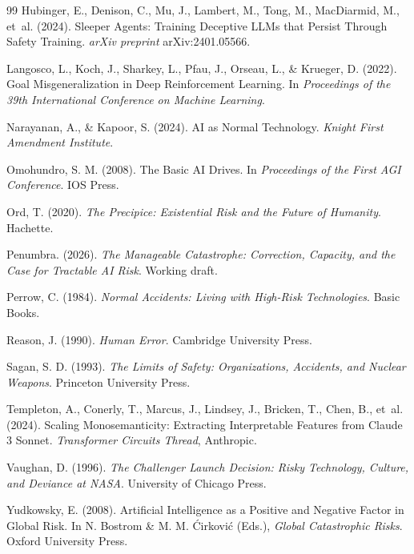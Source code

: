 \documentclass[11pt]{article}
\begin{document}
\begin{thebibliography}{99}
Hubinger, E., Denison, C., Mu, J., Lambert, M., Tong, M., MacDiarmid, M., et~al. (2024). Sleeper Agents: Training Deceptive LLMs that Persist Through Safety Training. \textit{arXiv preprint} arXiv:2401.05566.

Langosco, L., Koch, J., Sharkey, L., Pfau, J., Orseau, L., \& Krueger, D. (2022). Goal Misgeneralization in Deep Reinforcement Learning. In \textit{Proceedings of the 39th International Conference on Machine Learning}.

Narayanan, A., \& Kapoor, S. (2024). AI as Normal Technology. \textit{Knight First Amendment Institute}.

Omohundro, S. M. (2008). The Basic AI Drives. In \textit{Proceedings of the First AGI Conference}. IOS Press.

Ord, T. (2020). \textit{The Precipice: Existential Risk and the Future of Humanity}. Hachette.

Penumbra. (2026). \textit{The Manageable Catastrophe: Correction, Capacity, and the Case for Tractable AI Risk}. Working draft.

Perrow, C. (1984). \textit{Normal Accidents: Living with High-Risk Technologies}. Basic Books.

Reason, J. (1990). \textit{Human Error}. Cambridge University Press.

Sagan, S. D. (1993). \textit{The Limits of Safety: Organizations, Accidents, and Nuclear Weapons}. Princeton University Press.

Templeton, A., Conerly, T., Marcus, J., Lindsey, J., Bricken, T., Chen, B., et~al. (2024). Scaling Monosemanticity: Extracting Interpretable Features from Claude 3 Sonnet. \textit{Transformer Circuits Thread}, Anthropic.

Vaughan, D. (1996). \textit{The Challenger Launch Decision: Risky Technology, Culture, and Deviance at NASA}. University of Chicago Press.

Yudkowsky, E. (2008). Artificial Intelligence as a Positive and Negative Factor in Global Risk. In N. Bostrom \& M. M. \'{C}irkovi\'{c} (Eds.), \textit{Global Catastrophic Risks}. Oxford University Press.

\end{thebibliography}
\end{document}

